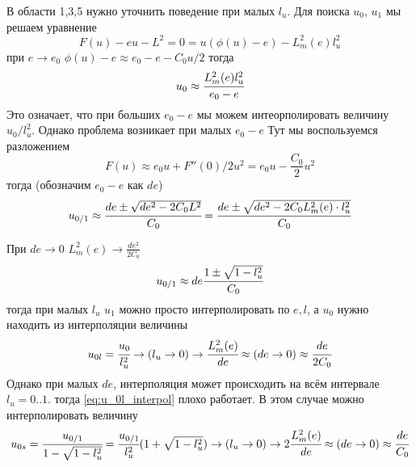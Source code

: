 	В области 1,3,5 нужно уточнить поведение при малых $l_u$. Для поиска $u_0$, $u_1$ мы решаем уравнение 
	\begin{equation*}
		F(u) - eu- L^2= 0 = u(\phi(u)-e) - L_m^2(e)l_u^2
	\end{equation*}
	при $e \rightarrow e_0$ $\phi(u)-e \approx e_0-e - C_0 u /2$
	тогда 
	\begin{equation*}
		u_0 \approx \cfrac{L_m^2(e)l_u^2}{e_0-e}
	\end{equation*}
	Это означает, что при больших $e_0-e$ мы можем интеорполировать величину $u_0/l_u^2$.
	Однако проблема возникает при малых $e_0-e$
	Тут мы воспользуемся разложением
	\begin{equation}
		F(u) \approx e_0 u + F''(0)/2 u^2 = 
		e_0 u - \frac{C_0}{2} u^2
		\label{eq:F_near_0}
	\end{equation}
	тогда (обозначим $e_0-e$ как $de$)
	\begin{equation}
	u_{0/1} \approx \cfrac{de \pm \sqrt{de^2-2C_0 L^2} }{C_0} =
	\cfrac{de \pm \sqrt{de^2-2C_0 L_m^2(e)\cdot l_u^2} }{C_0}
	\end{equation}
	
	При $de \rightarrow 0$ $L_m^2(e) \rightarrow \frac{de^2}{2C_0}$
	\begin{equation}
		u_{0/1} \approx de\cfrac{1 \pm \sqrt{1-l_u^2} }{C_0}
	\end{equation}
	тогда при малых $l_u$ $u_1$ можно просто интерполировать по $e,l$, а $u_0$ нужно находить из интерполяции величины
	\begin{equation}
		u_{0l} = \cfrac{u_0}{l_u^2} \rightarrow (l_u \rightarrow 0) \rightarrow 
		\cfrac{L_m^2(e)}{de} \approx (de \rightarrow 0) \approx \cfrac{de}{2 C_0}
		\label{eq:u_0l_interpol}
	\end{equation}
	Однако при малых $de$, интерполяция может происходить на всём интервале $l_u = 0..1$. тогда \ref{eq:u_0l_interpol} плохо работает. В этом случае можно интерполировать величину
	\begin{equation}
		u_{0s} = \cfrac{u_{0/1}}{1 - \sqrt{1-l_u^2}} =  \cfrac{u_{0/1}}{l_u^2} (1 + \sqrt{1-l_u^2})  \rightarrow (l_u \rightarrow 0) \rightarrow 
		2\cfrac{L_m^2(e)}{de} \approx (de \rightarrow 0) \approx \cfrac{de}{C_0}
		\label{eq:u_0l_soph_interpol}
	\end{equation}
	
		
